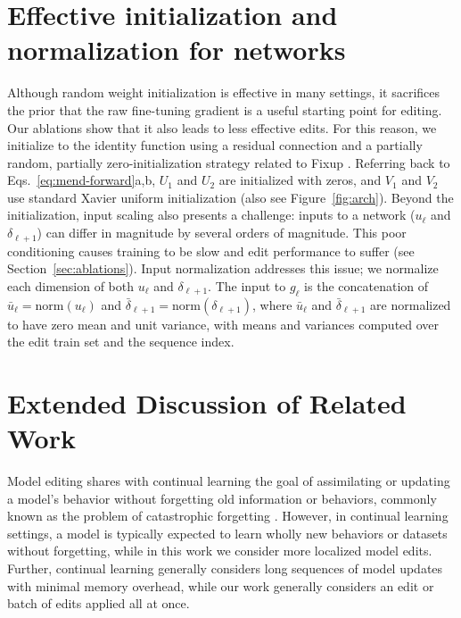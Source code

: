 \section{Effective initialization and normalization for {\name} networks}
\label{sec:init-norm}
Although random weight initialization is effective in many settings, it sacrifices the prior that the raw fine-tuning gradient is a useful starting point for editing. Our ablations show that it also leads to less effective edits. For this reason, we initialize {\name} to the identity function using a residual connection \citep{he2016deep} and a partially random, partially zero-initialization strategy related to Fixup \citep{zhang2018residual}. Referring back to Eqs.~\ref{eq:mend-forward}a,b, $U_1$ and $U_2$ are initialized with zeros, and $V_1$ and $V_2$ use standard Xavier uniform initialization \citep{pmlr-v9-glorot10a} (also see Figure~\ref{fig:arch}). Beyond the initialization, input scaling also presents a challenge: inputs to a {\name} network ($u_\ell$ and $\delta_{\ell+1}$) can differ in magnitude by several orders of magnitude. This poor conditioning causes training to be slow and edit performance to suffer (see Section~\ref{sec:ablations}). Input normalization addresses this issue; we normalize each dimension of both $u_\ell$ and $\delta_{\ell+1}$. The input to $g_\ell$ is the concatenation of $\bar{u}_\ell=\text{norm}(u_\ell)$ and $\bar{\delta}_{\ell+1} = \text{norm}(\delta_{\ell+1})$, where $\bar{u}_\ell$ and $\bar{\delta}_{\ell+1}$ are normalized to have zero mean and unit variance, with means and variances computed over the edit train set and the sequence index.

\section{Extended Discussion of Related Work}
\label{sec:extended-related-work}


Model editing shares with continual learning \citep{mccloskey1989catastrophic,parisi2018continual} the goal of assimilating or updating a model's behavior without forgetting old information or behaviors, commonly known as the problem of catastrophic forgetting \citep{mccloskey1989catastrophic,ratcliff1990connectionist,kirkpatrick2017overcoming}. However, in continual learning settings, a model is typically expected to learn wholly new behaviors or datasets \citep{kirkpatrick2017overcoming,parisi2018continual} without forgetting, while in this work we consider more localized model edits. Further, continual learning generally considers long sequences of model updates with minimal memory overhead, while our work generally considers an edit or batch of edits applied all at once. 

